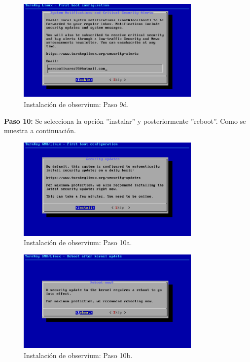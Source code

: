 \begin{figure}[htbp!]
	\centering
		\includegraphics[width=0.8\textwidth]{images/desarrollo/instalarObservium_paso9d.png}
	\caption{Instalación de observium: Paso 9d.}
\end{figure}

\pagebreak
\noindent
\textbf{Paso 10:} Se selecciona la opción ''instalar'' y posteriormente ''reboot''. Como se muestra a continuación.

\begin{figure}[htbp!]
	\centering
		\includegraphics[width=0.8\textwidth]{images/desarrollo/instalarObservium_paso10a.png}
	\caption{Instalación de observium: Paso 10a.}
\end{figure}

\begin{figure}[htbp!]
	\centering
		\includegraphics[width=0.8\textwidth]{images/desarrollo/instalarObservium_paso10b.png}
	\caption{Instalación de observium: Paso 10b.}
\end{figure}

